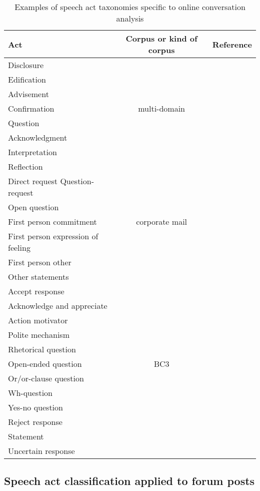 \documentclass[11pt]{article}
\begin{document}
\begin{table}
	\begin{tabularx}{\textwidth}{Y c c}
		\toprule
		Act & Corpus or kind of corpus & Reference \\
		\midrule
		Disclosure &  & \\
		Edification &  & \\
		Advisement &  & \\
		Confirmation & multi-domain & \cite{Lampert_classifyingspeech} \\
		Question &  & \\
		Acknowledgment &  & \\
		Interpretation &  & \\
		Reflection &  & \\
		\midrule
		Direct request
		Question-request &  & \\
		Open question &  & \\
		First person commitment & corporate mail & \cite{de2013classification} \\
		First person expression of feeling &  & \\
		First person other &  & \\
		Other statements &  & \\
		\midrule
		Accept response &  & \\
		Acknowledge and appreciate &  & \\
		Action motivator &  & \\
		Polite mechanism &  & \\
		Rhetorical question &  & \\
		Open-ended question & BC3 & \cite{JanAAAI08} \\
		Or/or-clause question &  & \\
		Wh-question &  & \\
		Yes-no question &  & \\
		Reject response &  & \\
		Statement &  & \\
		Uncertain response &  & \\
		\bottomrule
	\end{tabularx}
	\caption{Examples of speech act taxonomies specific to online conversation analysis}
	\label{fig:emailTaxonomies}
\end{table}

\subsection{Speech act classification applied to forum posts}
\end{document}
